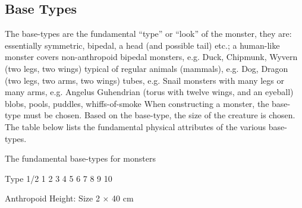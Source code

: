 \documentclass[twoside]{book}
\begin{document}
\subsection{Base Types}
     The base-types are the fundamental
               “type” or “look” of the monster,
               they are:   
                  essentially symmetric,
                 bipedal, a head (and possible tail) etc.; a human-like
                 monster 
                  covers non-anthropoid
                 bipedal monsters, e.g. Duck, Chipmunk, Wyvern (two legs,
                 two wings) 
                  typical of regular
                 animals (mammals), e.g. Dog, Dragon (two legs, two arms,
                 two wings) 
                tubes, e.g. Snail   
                  monsters with many legs
                 or many arms, e.g. Angelus Guhendrian (torus with twelve
                 wings, and an eyeball) 
                  blobs, pools, puddles,
                 whiffs-of-smoke 
             When constructing a monster, the base-type must be
               chosen. Based on the base-type, the size of the creature
               is chosen. The table below lists the fundamental physical
               attributes of the various base-types.   
                
                  
                    
                    
                    
                    
                    
                    
                    
                    
                    
                    
                    
                    
                  
                  
                  
                    The fundamental base-types for monsters
                    
                  
                  
                   Type   
                   1/2   
                   1   
                   2   
                   3   
                   4   
                   5   
                   6   
                   7   
                   8   
                   9   
                   10   
                  
                  
                   Anthropoid   
                    Height:     
                         Size  2 
                             ×    40 
                           cm     
                    
\end{document}
